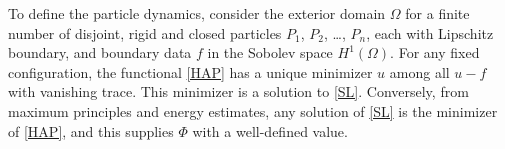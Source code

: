 %
%
%
To define the particle dynamics, consider the exterior domain $\Omega$
for a finite number of disjoint, rigid and closed particles $P_1$, $P_2$, \dots, $P_n$, each with Lipschitz boundary,
and boundary data $f$ in the Sobolev space $H^1(\Omega).$ 
For any fixed configuration, the functional \eqref{HAP} has a unique minimizer $u$
among all $u - f$ with vanishing trace. This minimizer is a solution to \eqref{SL}.
Conversely, from maximum principles and energy estimates,  any solution of 
\eqref{SL} is the minimizer of \eqref{HAP}, and this supplies $\Phi$ with a well-defined value.

